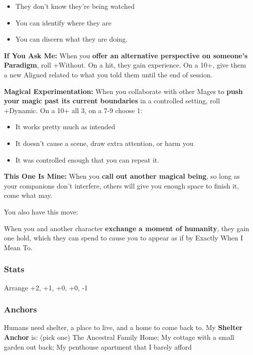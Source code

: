 \documentclass[
]{article}
\providecommand{\tightlist}{%
  \setlength{\itemsep}{0pt}\setlength{\parskip}{0pt}}
\begin{document}
\begin{itemize}
\tightlist
\item
  They don't know they're being watched
\item
  You can identify where they are
\item
  You can discern what they are doing.
\end{itemize}

\textbf{If You Ask Me:} When you \textbf{offer an alternative
perspective on someone's Paradigm}, roll +Without. On a hit, they gain
experience. On a 10+, give them a new Aligned related to what you told
them until the end of session.

\textbf{Magical Experimentation:} When you collaborate with other Mages
to \textbf{push your magic past its current boundaries} in a controlled
setting, roll +Dynamic. On a 10+ all 3, on a 7-9 choose 1:

\begin{itemize}
\tightlist
\item
  It works pretty much as intended
\item
  It doesn't cause a scene, draw extra attention, or harm you
\item
  It was controlled enough that you can repeat it.
\end{itemize}

\textbf{This One Is Mine:} When you \textbf{call out another magical
being}, so long as your companions don't interfere, others will give you
enough space to finish it, come what may.

You also have this move:

When you and another character \textbf{exchange a moment of humanity},
they gain one hold, which they can spend to cause you to appear as if by
Exactly When I Mean To.

\hypertarget{stats-3}{%
\subsubsection{Stats}\label{stats-3}}

Arrange +2, +1, +0, +0, -1

\hypertarget{anchors-2}{%
\subsubsection{Anchors}\label{anchors-2}}

Humans need shelter, a place to live, and a home to come back to. My
\textbf{Shelter Anchor} is: (pick one) The Ancestral Family Home; My
cottage with a small garden out back; My penthouse apartment that I
barely afford
\end{document}

